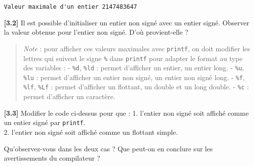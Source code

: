 \documentclass[11pt]{article}
\begin{document}
    \begin{Verbatim}[commandchars=\\\{\}]
Valeur maximale d'un entier 2147483647
    \end{Verbatim}

    \textbf{{[}3.2{]}} Il est possible d'initialiser un entier non signé
avec un entier signé. Observer la valeur obtenue pour l'entier non
signé. D'où provient-elle ?

    \begin{quote}
\emph{Note} : pour afficher ces valeurs maximales avec \texttt{printf},
on doit modifier les lettres qui suivent le signe \texttt{\%} dans
\texttt{printf} pour adapter le format au type des variables : -
\texttt{\%d}, \texttt{\%ld} : permet d'afficher un entier, un entier
long. - \texttt{\%u}, \texttt{\%lu} : permet d'afficher un entier non
signé, un entier non signé long. - \texttt{\%f}, \texttt{\%lf},
\texttt{\%Lf} : permet d'afficher un flottant, un double et un long
double. - \texttt{\%c} : permet d'afficher un caractère.
\end{quote}

    \textbf{{[}3.3{]}} Modifier le code ci-dessus pour que : 1. l'entier non
signé soit affiché comme un entier signé par \texttt{printf}.\\
2. l'entier non signé soit affiché comme un flottant simple.

Qu'observez-vous dans les deux cas ? Que peut-on en conclure sur les
avertissements du compilateur ?
\end{document}
